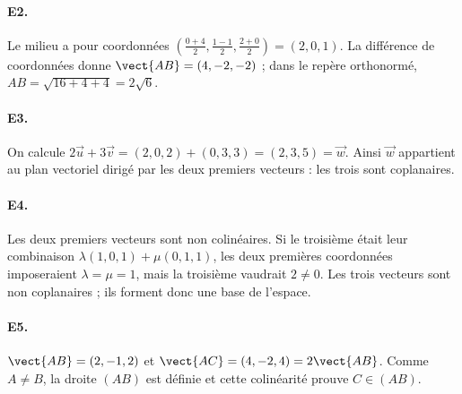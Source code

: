 \paragraph{E2.}Le milieu a pour coordonnées $(\frac{0+4}{2},\frac{1-1}{2},\frac{2+0}{2})=(2,0,1)$. La différence de coordonnées donne $\vect{AB}=(4,-2,-2)$ ; dans le repère orthonormé, $AB=\sqrt{16+4+4}=2\sqrt6$.

\paragraph{E3.}On calcule $2\vec u+3\vec v=(2,0,2)+(0,3,3)=(2,3,5)=\vec w$. Ainsi $\vec w$ appartient au plan vectoriel dirigé par les deux premiers vecteurs : les trois sont coplanaires.

\paragraph{E4.}Les deux premiers vecteurs sont non colinéaires. Si le troisième était leur combinaison $\lambda(1,0,1)+\mu(0,1,1)$, les deux premières coordonnées imposeraient $\lambda=\mu=1$, mais la troisième vaudrait $2\ne0$. Les trois vecteurs sont non coplanaires ; ils forment donc une base de l'espace.

\paragraph{E5.}$\vect{AB}=(2,-1,2)$ et $\vect{AC}=(4,-2,4)=2\vect{AB}$. Comme $A\ne B$, la droite $(AB)$ est définie et cette colinéarité prouve $C\in(AB)$.

